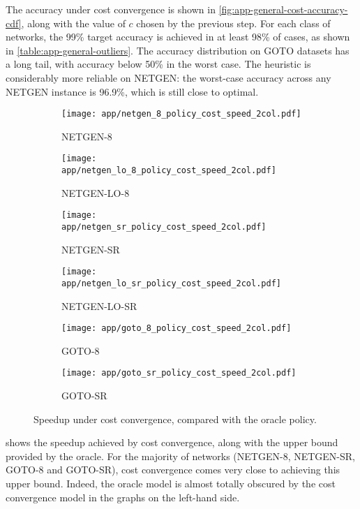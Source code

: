 The accuracy under cost convergence is shown in \cref{fig:app-general-cost-accuracy-cdf}, along with the value of $c$ chosen by the previous step. For each class of networks, the 99\% target accuracy is achieved in at least 98\% of cases, as shown in \cref{table:app-general-outliers}. The accuracy distribution on GOTO datasets has a long tail, with accuracy below 50\% in the worst case. The heuristic is considerably more reliable on NETGEN: the worst-case accuracy across any NETGEN instance is 96.9\%, which is still close to optimal.

\begin{figure}
    \begin{widepage}
        \begin{subfigure}[c]{0.5\textwidth}
            \texttt{[image: app/netgen\_8\_policy\_cost\_speed\_2col.pdf]}
            \caption{NETGEN-8}
        \end{subfigure}
        \begin{subfigure}[c]{0.5\textwidth}
            \texttt{[image: app/netgen\_lo\_8\_policy\_cost\_speed\_2col.pdf]}
            \caption{NETGEN-LO-8}
        \end{subfigure}
        \begin{subfigure}[c]{0.5\textwidth}
            \texttt{[image: app/netgen\_sr\_policy\_cost\_speed\_2col.pdf]}
            \caption{NETGEN-SR}
        \end{subfigure}
        \begin{subfigure}[c]{0.5\textwidth}
            \texttt{[image: app/netgen\_lo\_sr\_policy\_cost\_speed\_2col.pdf]}
            \caption{NETGEN-LO-SR}
        \end{subfigure}
        \begin{subfigure}[c]{0.5\textwidth}
            \texttt{[image: app/goto\_8\_policy\_cost\_speed\_2col.pdf]}
            \caption{GOTO-8}
        \end{subfigure}
        \begin{subfigure}[c]{0.5\textwidth}
            \texttt{[image: app/goto\_sr\_policy\_cost\_speed\_2col.pdf]}
            \caption{GOTO-SR}
        \end{subfigure}
    \end{widepage}
    \caption{Speedup under {\color{matplotlib_blue}cost convergence}, compared with the {\color{matplotlib_green}oracle policy}.}
    \label{fig:app-general-cost-speed-cdf}
\end{figure}

 shows the speedup achieved by cost convergence, along with the upper bound provided by the oracle. For the majority of networks (NETGEN-8, NETGEN-SR, GOTO-8 and GOTO-SR), cost convergence comes very close to achieving this upper bound. Indeed, the oracle model is almost totally obscured by the cost convergence model in the graphs on the left-hand side.

